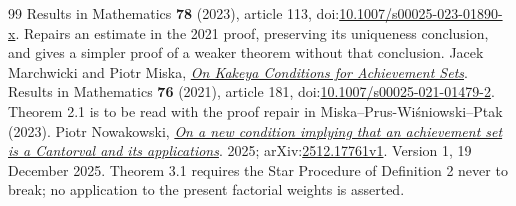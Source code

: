 \begin{thebibliography}{99}
  Results in Mathematics \textbf{78} (2023), article 113, doi:\href{https://doi.org/10.1007/s00025-023-01890-x}{10.1007/s00025-023-01890-x}. Repairs an estimate in the 2021 proof, preserving its uniqueness conclusion, and gives a simpler proof of a weaker theorem without that conclusion.
 Jacek Marchwicki and Piotr Miska, \href{https://link.springer.com/article/10.1007/s00025-021-01479-2}{\emph{On Kakeya Conditions for Achievement Sets}}.
  Results in Mathematics \textbf{76} (2021), article 181, doi:\href{https://doi.org/10.1007/s00025-021-01479-2}{10.1007/s00025-021-01479-2}. Theorem 2.1 is to be read with the proof repair in Miska--Prus-Wi\'sniowski--Ptak (2023).
 Piotr Nowakowski, \href{https://arxiv.org/abs/2512.17761v1}{\emph{On a new condition implying that an achievement set is a Cantorval and its applications}}.
  2025; arXiv:\href{https://arxiv.org/abs/2512.17761v1}{2512.17761v1}. Version 1, 19 December 2025. Theorem 3.1 requires the Star Procedure of Definition 2 never to break; no application to the present factorial weights is asserted.
\end{thebibliography}



